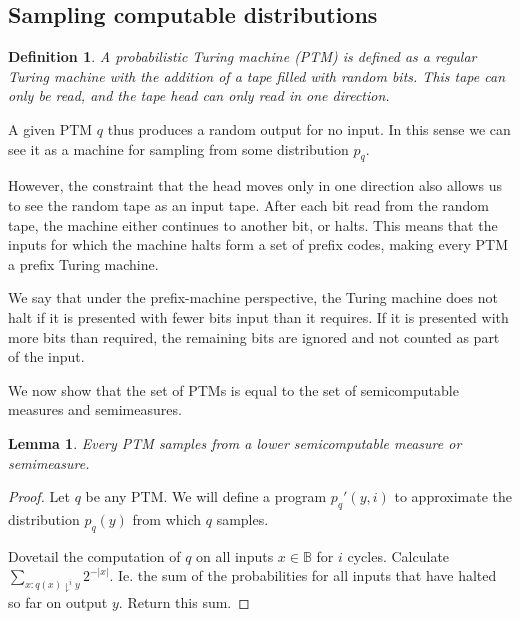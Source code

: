 \documentclass[10pt,a4paper,oneside]{article}
\newtheorem{lma}{Lemma}
\newtheorem{dfn}{Definition}
\begin{document}
\subsection*{Sampling computable distributions}

\begin{dfn}
A \emph{probabilistic Turing machine} (PTM) is defined as a regular Turing machine with the addition of a tape filled with random bits. This tape can only be read, and the tape head can only read in one direction.
\end{dfn}

A given PTM $q$ thus produces a random output for no input. In this sense we can see it as a machine for sampling from some distribution $p_q$. 

However, the constraint that the head moves only in one direction also allows us to see the random tape as an input tape. After each bit read from the random tape, the machine either continues to another bit, or halts. This means that the inputs for which the machine halts form a set of prefix codes, making every PTM a prefix Turing machine.

We say that under the prefix-machine perspective, the Turing machine does not halt if it is presented with fewer bits input than it requires. If it is presented with more bits than required, the remaining bits are ignored and not counted as part of the input.

We now show that the set of PTMs is equal to the set of semicomputable measures and semimeasures.

\begin{lma}
Every PTM samples from a lower semicomputable measure or semimeasure.
\end{lma}
\begin{proof}
Let $q$ be any PTM. We will define a program $p_q'(y, i)$ to approximate the distribution $p_q(y)$ from which $q$ samples. 

Dovetail the computation of $q$ on all inputs $x \in \mathbb B$ for $i$ cycles. Calculate $\sum_{x : q(x) \downharpoonright^i y}2^{-|x|}$. Ie. the sum of the probabilities for all inputs that have halted so far on output $y$. Return this sum.



 
\end{proof}
\end{document}
